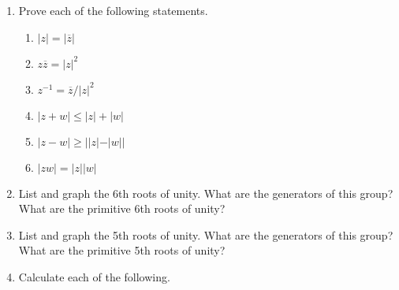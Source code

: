 {\begin{enumerate}
\begin{multicols}{2}
\begin{enumerate}
 \item
$(1+i)^{-1}$

 \item
$(1 - i)^{6}$
 
 \item
$(\sqrt{3}+i)^{5}$

 \item
$(-i)^{10}$
 
 \item
$((1-i)/2)^{4}$

 \item
$(-\sqrt{2} - \sqrt{2}\, i)^{12}$
 
 \item
$(-2+2i)^{-5}$
 
\end{enumerate}
\end{multicols}

  
  \item
Prove each of the following statements.
\begin{multicols}{2}
\begin{enumerate}
 
 \item
$|z| = | \overline{z}|$

\item
$z \overline{z} = |z|^2$
 
 \item
$z^{-1} = \overline{z} / |z|^2$

 \item
$|z +w| \leq |z| + |w|$
 
 \item
$|z - w| \geq | |z| - |w||$
 
 \item
$|z w| = |z|  |w|$
 
\end{enumerate}
\end{multicols}


\item
List and graph the 6th roots of unity.  What are the generators of
this group?  What are the primitive 6th roots of unity?
 
 
\item
List and graph the 5th roots of unity.  What are the generators of
this group?  What are the primitive 5th roots of unity? 
 
 
  
\item
Calculate each of the following.
\begin{multicols}{2}
\begin{enumerate}
 

\end{enumerate}
\end{multicols}
\end{enumerate}}
